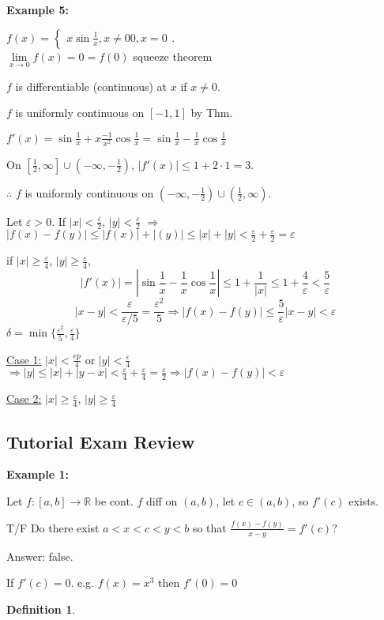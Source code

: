 \documentclass[12pt]{article}
\newcommand{\abs}[1]{\left| #1 \right|}
\theoremstyle{plain}
\newtheorem{definition}{Definition}[subsection]
\newcommand{\ep}{\varepsilon}
\newcommand{\dlim}{\displaystyle\lim\limits}
\begin{document}
	{\color{Brown}
	\textbf{Example 5: }

	$f(x) = \begin{cases}
		x \sin\frac1x,  x\neq 0
		0,  x = 0
	\end{cases}$.\\

	$\dlim_{x\to 0} f(x) = 0 = f(0)$ squeeze theorem

	$f$ is differentiable (continuous) at $x$ if $x\neq 0$.

	$f$ is uniformly continuous on $[-1, 1]$ by Thm. 

	$f'(x) = \sin \frac1x+x\frac{-1}{x^2} \cos \frac1x 
	= \sin \frac1x-\frac1x\cos\frac1x$ 

	On $[\frac12,\infty]\cup (-\infty, -\frac12)$,
	$\abs{f'(x)}\leq 1+2\cdot 1=3$.

	$\therefore$ $f$ is uniformly continuous on $(-\infty, -\frac12) 
	\cup (\frac12, \infty)$.

	Let $\ep > 0$. If $\abs x < \frac{\ep}2$, $\abs y < \frac{\ep}2$ 
	$\Rightarrow$ $\abs{f(x)-f(y)} \leq \abs{f(x)}+\abs{(y)}\leq \abs x+\abs y
	<\frac{\ep}2+\frac{\ep}2= \ep$

	if $\abs x \geq \frac{\ep}4$, $\abs y \geq \frac{\ep} 4$, 
	\[
		\abs{f'(x)}=\abs{\sin \frac1x-\frac1x\cos \frac1x}
		\leq 1+\frac1{\abs x}\leq 1+\frac 4{\ep}<\frac5{\ep}
	\]
	\[
		\abs{x-y} < \frac{\ep}{\ep/5}=\frac{\ep^2}5\Rightarrow \abs{f(x)-f(y)}
		\leq \frac 5{\ep} \abs{x-y} < \ep
	\]
	$\delta = \min \{\frac{\ep^2}5, \frac{\ep}4\}$
	
	\underline{Case 1:} $\abs{x} < \frac{ep}4$ or $\abs y<\frac{\ep}4$ 
	$\Rightarrow \abs{y}\leq \abs x + \abs{y-x} < \frac{\ep}4+\frac{\ep}4
	=\frac{\ep}2 \Rightarrow \abs{f(x)-f(y)}<\ep$ 

	\underline{Case 2:} $\abs{x} \geq \frac{\ep}4$, $\abs y\geq \frac{\ep}4$
	}
	


	\vspace{2.0in}
	{\color{Periwinkle}
	\subsection{Tutorial Exam Review}
	
	\textbf{Example 1: }
	
	Let $f:[a,b]\to\mathbb{R}$ be cont. $f$ diff on $(a,b)$, let $c\in(a,b)$,
	so $f'(c)$ exists.

	T/F Do there exist $a < x < c < y < b$ so that 
	$\frac{f(x)-f(y)}{x-y} = f'(c)$?

	Answer: false. 

	If $f'(c)=0$. 
	e.g. $f(x) = x^3$ then $f'(0)=0$ 


	\begin{definition}

	\end{definition}
}
\end{document}
